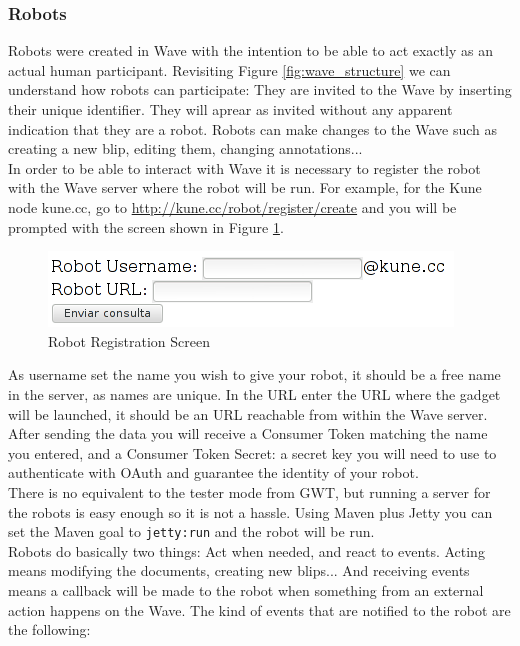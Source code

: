\subsubsection{Robots}
Robots were created in Wave with the intention to be able to act exactly as an actual human participant. Revisiting Figure \ref{fig:wave_structure} we can understand how robots can participate: They are invited to the Wave by inserting their unique identifier. They will aprear as invited without any apparent indication that they are a robot. Robots can make changes to the Wave such as creating a new blip, editing them, changing annotations...\\[.2cm]
In order to be able to interact with Wave it is necessary to register the robot with the Wave server where the robot will be run. For example, for the Kune node kune.cc, go to \url{http://kune.cc/robot/register/create} and you will be prompted with the screen shown in Figure \ref{fig:robot_register}.
\begin{figure}[H]
  \center
    \includegraphics[keepaspectratio, scale=0.6]{Media/Captures/Wave/RegisterRobot.png}
  \caption{Robot Registration Screen}
  \label{fig:robot_register}
\end{figure}
As username set the name you wish to give your robot, it should be a free name in the server, as names are unique. In the URL enter the URL where the gadget will be launched, it should be an URL reachable from within the Wave server. After sending the data you will receive a Consumer Token matching the name you entered, and a Consumer Token Secret: a secret key you will need to use to authenticate with OAuth and guarantee the identity of your robot.\\[.2cm]
There is no equivalent to the tester mode from GWT, but running a server for the robots is easy enough so it is not a hassle. Using Maven plus Jetty you can set the Maven goal to \verb|jetty:run| and the robot will be run.\\[.2cm]
Robots do basically two things: Act when needed, and react to events. Acting means modifying the documents, creating new blips... And receiving events means a callback will be made to the robot when something from an external action happens on the Wave. The kind of events that are notified to the robot are the following:
